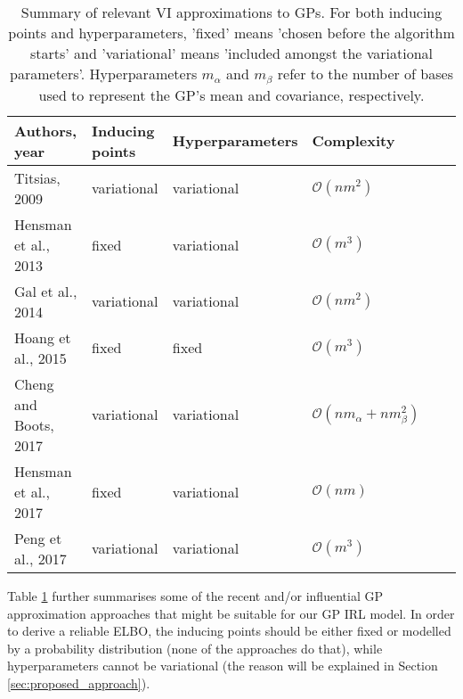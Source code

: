 \documentclass{mprop}
\theoremstyle{definition}
\begin{document}
\begin{table}
  \centering %
  \begin{tabular}{llllll}
    \toprule
    Authors, year & Inducing points & Hyperparameters & Complexity \\
    \midrule
    Titsias, 2009 \cite{DBLP:journals/jmlr/Titsias09} & variational & variational & $\mathcal{O}(nm^2)$ \\
    Hensman et al., 2013 \cite{DBLP:conf/uai/HensmanFL13} & fixed & variational & $\mathcal{O}(m^3)$ \\
    Gal et al., 2014 \cite{DBLP:conf/nips/GalWR14} & variational & variational & $\mathcal{O}(nm^2)$ \\
    Hoang et al., 2015 \cite{DBLP:conf/icml/HoangHL15} & fixed & fixed & $\mathcal{O}(m^3)$ \\
    Cheng and Boots, 2017 \cite{DBLP:conf/nips/ChengB17} & variational & variational & $\mathcal{O}(nm_\alpha + nm_\beta^2)$ \\
    Hensman et al., 2017 \cite{DBLP:journals/jmlr/HensmanDS17} & fixed & variational & $\mathcal{O}(nm)$ \\
    Peng et al., 2017 \cite{DBLP:conf/icml/PengZZQ17} & variational & variational & $\mathcal{O}(m^3)$ \\
    \bottomrule
  \end{tabular}
  \caption{Summary of relevant VI approximations to GPs. For both inducing
    points and hyperparameters, 'fixed' means 'chosen before the algorithm
    starts' and 'variational' means 'included amongst the variational
    parameters'. Hyperparameters $m_\alpha$ and $m_\beta$ refer to the number of
    bases used to represent the GP's mean and covariance, respectively.}
  \label{table:approximations}
\end{table}

Table \ref{table:approximations} further summarises some of the recent and/or
influential GP approximation approaches that might be suitable for our GP IRL
model. In order to derive a reliable ELBO, the inducing points should be either
fixed or modelled by a probability distribution (none of the approaches do
that), while hyperparameters cannot be variational (the reason will be explained
in Section \ref{sec:proposed_approach}).
\end{document}
